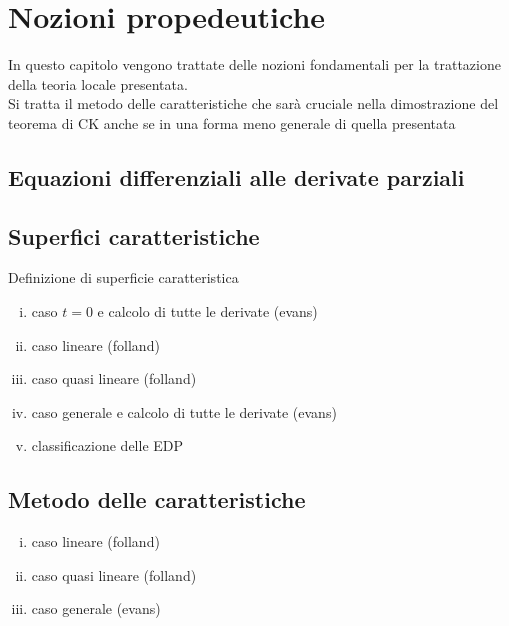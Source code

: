 \chapter{Nozioni propedeutiche}
In questo capitolo vengono trattate delle nozioni fondamentali per la trattazione della teoria locale presentata.\\
Si tratta il metodo delle caratteristiche che sarà cruciale nella dimostrazione del teorema di CK anche se in una forma meno generale di quella presentata

\section{Equazioni differenziali alle derivate parziali}
\section{Superfici caratteristiche}
Definizione di superficie caratteristica

\begin{enumerate}[i.]
\item
caso $t=0$ e calcolo di tutte le derivate (evans)
\item
caso lineare (folland)
\item
caso quasi lineare (folland)
\item
caso generale e calcolo di tutte le derivate (evans)
\item 
classificazione delle EDP
\end{enumerate}


\section{Metodo delle caratteristiche}

\begin{enumerate}[i.]
\item
caso lineare (folland)
\item
caso quasi lineare (folland)
\item
caso generale (evans)
\end{enumerate}